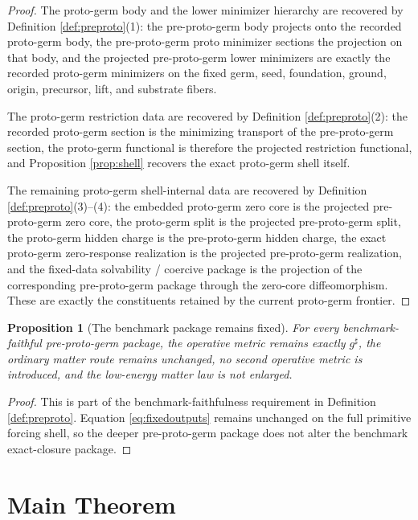 \documentclass[11pt]{article}
\newcommand{\CompletedMetric}{g^{\sharp}}
\newtheorem{proposition}{Proposition}
\begin{document}
\begin{proof}
The proto-germ body and the lower minimizer hierarchy are recovered by Definition \ref{def:preproto}(1): the pre-proto-germ body projects onto the recorded proto-germ body, the pre-proto-germ proto minimizer sections the projection on that body, and the projected pre-proto-germ lower minimizers are exactly the recorded proto-germ minimizers on the fixed germ, seed, foundation, ground, origin, precursor, lift, and substrate fibers.

The proto-germ restriction data are recovered by Definition \ref{def:preproto}(2): the recorded proto-germ section is the minimizing transport of the pre-proto-germ section, the proto-germ functional is therefore the projected restriction functional, and Proposition \ref{prop:shell} recovers the exact proto-germ shell itself.

The remaining proto-germ shell-internal data are recovered by Definition \ref{def:preproto}(3)--(4): the embedded proto-germ zero core is the projected pre-proto-germ zero core, the proto-germ split is the projected pre-proto-germ split, the proto-germ hidden charge is the pre-proto-germ hidden charge, the exact proto-germ zero-response realization is the projected pre-proto-germ realization, and the fixed-data solvability / coercive package is the projection of the corresponding pre-proto-germ package through the zero-core diffeomorphism. These are exactly the constituents retained by the current proto-germ frontier.
\end{proof}

\begin{proposition}[The benchmark package remains fixed]
\label{prop:boundary}
For every benchmark-faithful pre-proto-germ package, the operative metric remains exactly \(\CompletedMetric\), the ordinary matter route remains unchanged, no second operative metric is introduced, and the low-energy matter law is not enlarged.
\end{proposition}

\begin{proof}
This is part of the benchmark-faithfulness requirement in Definition \ref{def:preproto}. Equation \eqref{eq:fixedoutputs} remains unchanged on the full primitive forcing shell, so the deeper pre-proto-germ package does not alter the benchmark exact-closure package.
\end{proof}

\section{Main Theorem}
\end{document}

